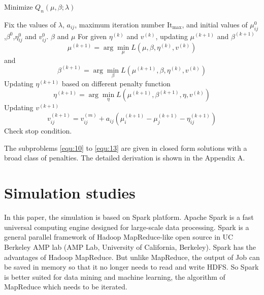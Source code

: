 \documentclass[review]{elsarticle}
\begin{document}
 \begin{algorithm}[H]
 	\caption{Minimize $Q_n(\mu,\beta;\lambda)$}
 	\label{alg:2}
 	\begin{algorithmic}[1]
 		\REQUIRE
 		Fix the values of $\lambda$, $a_{ij}$,  maximum iteration number $\textrm{It}_{\max}$, and initial values of  $\mu_{ij}^0$,$\beta^0$,$\eta_{ij}^0$ and $v_{ij}^0$.
 		\ENSURE $\beta$ and $\mu$
 		\STATE For given $\eta^{(k)}$ and $v^{(k)}$, updating $\mu^{(k+1)}$ and $\beta^{(k+1)}$
 		\begin{equation}\label{equ:10}
 		\mu^{(k+1)} = \arg\min_{\mu}L(\mu,\beta,\eta^{(k)},v^{(k)})
 		\end{equation}
 		and
 		\begin{equation}\label{equ:11}
 		\beta^{(k+1)} = \arg\min_{\beta}L(\mu^{(k+1)},\beta,\eta^{(k)},v^{(k)})
 		\end{equation}
 		\STATE Updating $\eta^{(k+1)}$ based on different penalty function
 		\begin{equation}\label{equ:12}
 		\eta^{(k+1)} = \arg\min_{\eta}L(\mu^{(k+1)},\beta^{(k+1)},\eta,v^{(k)})
 		\end{equation}
 		\STATE Updating $v^{(k+1)}$
 		\begin{equation}\label{equ:13}
 		v_{ij}^{(k+1)}=v_{ij}^{(m)} + a_{ij}(\mu_i^{(k+1)}-\mu_j^{(k+1)}-\eta_{ij}^{(k+1)})
 		\end{equation}
 		\STATE Check stop condition.
 		\ENDFOR
 	\end{algorithmic}
 \end{algorithm}
The subproblems \ref{equ:10} to \ref{equ:13} are given in closed form solutions with a broad class of penalties. 
The detailed derivation is shown in the Appendix A.
\section{Simulation studies}\label{sec:4}
In this paper, the simulation is based on Spark platform. Apache Spark is a fast universal computing engine designed for large-scale data processing. Spark is a general parallel framework of Hadoop MapReduce-like open source in UC Berkeley AMP lab (AMP Lab, University of California, Berkeley). Spark has the advantages of Hadoop MapReduce. But unlike MapReduce, the output of Job can be saved in memory so that it no longer needs to read and write HDFS. So Spark is better suited for data mining and machine learning, the algorithm of MapReduce which needs to be iterated.
\end{document}
